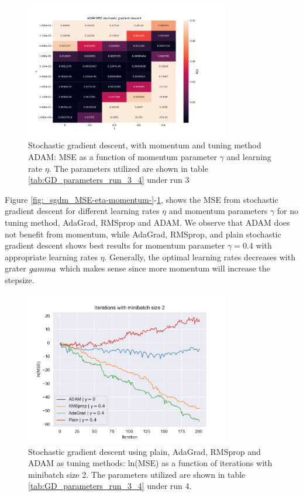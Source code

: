 \begin{figure}[H]
\centering
\includegraphics[width=0.8\textwidth]{Figures/PartA/ADAM_sgdm_MSE(eta,momentum)}
\caption{Stochastic gradient descent, with momentum and tuning method ADAM: MSE
    as a function of momentum parameter $\gamma$ and learning rate \(\eta \). The parameters utilized are shown in table \ref{tab:GD_parameters_run_3_4} under run 3	 }
\label{fig:ADAM_sgdm_MSE-eta-momentum-}
\end{figure}

Figure \ref{fig:_sgdm_MSE-eta-momentum-}-\ref{fig:ADAM_sgdm_MSE-eta-momentum-}, shows the MSE from stochastic gradient descent for different
learning rates $\eta $ and momentum parameters $\gamma $ for no tuning method, AdaGrad, RMSprop and ADAM. We observe that ADAM does not benefit 
from momentum, while AdaGrad, RMSprop, and plain stochastic gradient descent shows best results for momentum parameter $\gamma =0.4$ with appropriate 
learning rates $\eta $. Generally, the optimal learning rates decreases with grater $\\gamma  $ which makes sense since more momentum
will increase the stepsize. 


\begin{figure}[H]
\centering
\includegraphics[width=0.8\textwidth]{Figures/PartA/minibatch_2_MSE(iter).pdf}
\caption{Stochastic gradient descent using plain, AdaGrad, RMSprop and ADAM as tuning methods: ln(MSE) as a function of iterations with minibatch size 2.
The parameters utilized are shown in table \ref{tab:GD_parameters_run_3_4} under run 4.}
\label{fig:minibatch_2_MSE-iter}
\end{figure}

